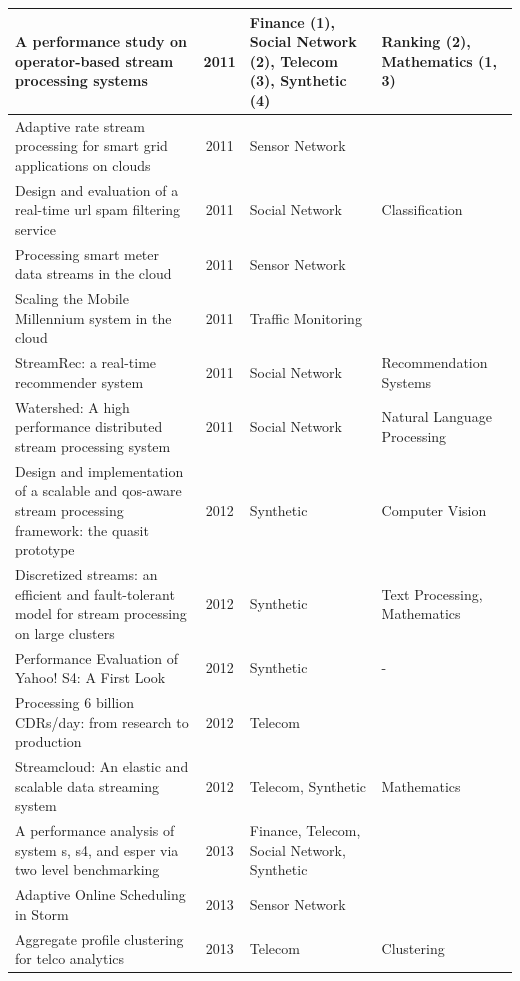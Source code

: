 \documentclass[ppgc,diss,english]{iiufrgs}
\begin{document}
\begin{center}
\begin{longtable}{ | p{8cm} | c | p{3cm} | p{2.5cm} |}
		A performance study on operator-based stream processing systems \cite{dayarathna2011performance} & 2011 & Finance (1), Social Network (2), Telecom (3), Synthetic (4) & Ranking (2), Mathematics (1, 3) \\\hline
		Adaptive rate stream processing for smart grid applications on clouds \cite{simmhan2011adaptive} & 2011 & Sensor Network & \\\hline
		Design and evaluation of a real-time url spam filtering service \cite{thomas2011design} & 2011 & Social Network & Classification \\\hline
		Processing smart meter data streams in the cloud \cite{lohrmann2011processing} & 2011 & Sensor Network & \\\hline
		Scaling the Mobile Millennium system in the cloud \cite{hunter2011scaling} & 2011 & Traffic Monitoring & \\\hline
		StreamRec: a real-time recommender system \cite{chandramouli2011streamrec} & 2011 & Social Network & Recommendation Systems \\\hline
		Watershed: A high performance distributed stream processing system \cite{de2011watershed} & 2011 & Social Network & Natural Language Processing \\\hline
		Design and implementation of a scalable and qos-aware stream processing framework: the quasit prototype \cite{bellavista2012design} & 2012 & Synthetic & Computer Vision \\\hline
		Discretized streams: an efficient and fault-tolerant model for stream processing on large clusters \cite{zaharia2012discretized} & 2012 & Synthetic & Text Processing, Mathematics \\\hline
		Performance Evaluation of Yahoo! S4: A First Look \cite{chauhan2012performance} & 2012 & Synthetic & - \\\hline
		Processing 6 billion CDRs/day: from research to production \cite{bouillet2012processing} & 2012 & Telecom & \\\hline
		Streamcloud: An elastic and scalable data streaming system \cite{gulisano2012streamcloud} & 2012 & Telecom, Synthetic & Mathematics \\\hline
		A performance analysis of system s, s4, and esper via two level benchmarking \cite{dayarathna2013performance} & 2013 & Finance, Telecom, Social Network, Synthetic & \\\hline
		Adaptive Online Scheduling in Storm \cite{aniello2013adaptive} & 2013 & Sensor Network & \\\hline
		Aggregate profile clustering for telco analytics \cite{abbasouglu2013aggregate} & 2013 & Telecom & Clustering \\\hline

\end{longtable}
\end{center}
\end{document}
